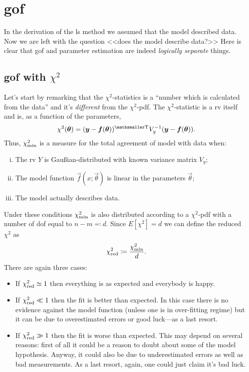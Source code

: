 \section{\acl{gof}}

In the derivation of the \ac{ls} method we assumed that the model described data.
Now we are left with the question <<does the model describe data?>>
Here is clear that \ac{gof} and parameter estimation are indeed \emph{logically separate} things.

\subsection{\acl{gof} with $\chi^2$}

Let's start by remarking that the $\chi^2$-statistics is a ``number which is calculated from the data'' and it's \emph{different} from the $\chi^2$-\ac{pdf}.
The $\chi^2$-statistic is a \ac{rv} itself and is, as a function of the parameters,
\begin{equation}
	\chi^2(\vec{\theta}) = \transpose{(\vec{y} - \vec{f}(\vec{\theta}))}V_y^{-1}(\vec{y} - \vec{f}(\vec{\theta})).
\end{equation}
Thus, $\chi^2_\textup{min}$ is a measure for the total  agreement of model with data when:
\begin{enumerate}[(i)]
	\item
		The \ac{rv} $Y$ is Gau\ss{}ian-distributed with known variance matrix $V_y$;
	\item
		The model function $\vec{f}(x;\vec{\theta})$ is linear in the parameters $\vec{\theta}$;
	\item
		The model actually describes data.
\end{enumerate}
Under these conditions $\chi^2_\textup{min}$ is also distributed according to a $\chi^2$-\ac{pdf} with a number of \ac{dof} equal to $n-m\eqqcolon d$.
Since $E[\chi^2] = d$ we can define the reduced $\chi^2$ as
\begin{equation}
	\chi^2_\textup{red} \coloneqq \frac{\chi^2_\textup{min}}{d}.
\end{equation}
There are again three cases:
\begin{itemize}
	\item
		If $\chi^2_\textup{red} \simeq 1$ then everything is as expected and everybody is happy.
	\item
		If $\chi^2_\textup{red} \ll 1$ then the fit is better than expected.
		In this case there is no evidence against the model function (unless one is in over-fitting regime) but it can be due to overestimated errors or good luck---as a last resort.
	\item
		If $\chi^2_\textup{red} \gg 1$ then the fit is worse than expected.
		This may depend on several reasons: first of all it could be a reason to doubt about some of the model hypothesis.
		Anyway, it could also be due  to underestimated errors as well as bad measurements.
		As a last resort, again, one could just claim it's bad luck.
\end{itemize}



